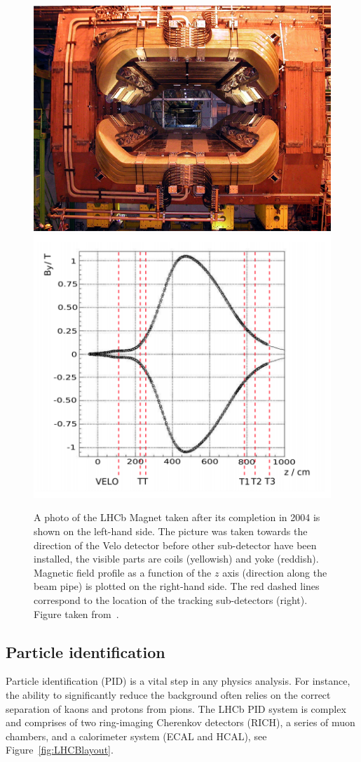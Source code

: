 \begin{figure}[h]
 \begin{center}
  \includegraphics[width=0.49\linewidth]{figures/magnet_photo.jpg}
   \includegraphics[width=0.49\linewidth]{figures/magnet_profile.PNG}
   \caption{A photo of the LHCb Magnet taken after its completion in 2004 is shown on the left-hand side. The picture was taken towards the direction of the Velo detector before other sub-detector have been installed, the visible parts are coils (yellowish) and yoke (reddish). Magnetic field profile as a function of the $z$ axis (direction along the beam pipe) is plotted on the right-hand side. The red dashed lines correspond to the location of the tracking sub-detectors (right). Figure taken from~\cite{lhcb}.   
     \label{fig:magnet}}
 \end{center}
\end{figure}


\subsection{Particle identification}

Particle identification (PID) is a vital step in any physics analysis. For instance, the ability to significantly reduce the background often relies on the correct separation of kaons and protons from pions. The LHCb PID system is complex and comprises of two ring-imaging Cherenkov detectors (RICH), a series of muon chambers, and a calorimeter system (ECAL and HCAL), see Figure~\ref{fig:LHCBlayout}. 


